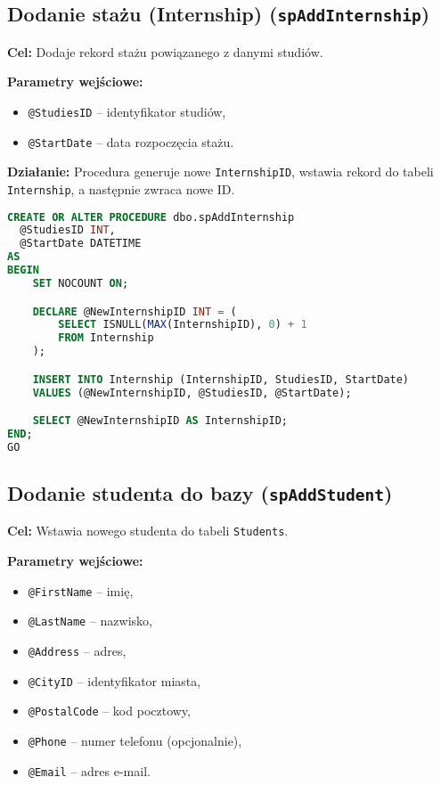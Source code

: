 \documentclass[12pt]{article}
\begin{document}
\newpage
\subsection{Dodanie stażu (Internship) (\texttt{spAddInternship})}
\textbf{Cel:} Dodaje rekord stażu powiązanego z danymi studiów.

\textbf{Parametry wejściowe:}
\begin{itemize}
  \item \verb|@StudiesID| – identyfikator studiów,
  \item \verb|@StartDate| – data rozpoczęcia stażu.
\end{itemize}

\textbf{Działanie:} Procedura generuje nowe \verb|InternshipID|, wstawia rekord do tabeli \verb|Internship|, a następnie zwraca nowe ID.

\begin{lstlisting}[language=SQL]
CREATE OR ALTER PROCEDURE dbo.spAddInternship
  @StudiesID INT,
  @StartDate DATETIME
AS
BEGIN
    SET NOCOUNT ON;

    DECLARE @NewInternshipID INT = (
        SELECT ISNULL(MAX(InternshipID), 0) + 1
        FROM Internship
    );

    INSERT INTO Internship (InternshipID, StudiesID, StartDate)
    VALUES (@NewInternshipID, @StudiesID, @StartDate);

    SELECT @NewInternshipID AS InternshipID;
END;
GO
\end{lstlisting}

\newpage
\subsection{Dodanie studenta do bazy (\texttt{spAddStudent})}
\textbf{Cel:} Wstawia nowego studenta do tabeli \verb|Students|.

\textbf{Parametry wejściowe:}
\begin{itemize}
  \item \verb|@FirstName| – imię,
  \item \verb|@LastName| – nazwisko,
  \item \verb|@Address| – adres,
  \item \verb|@CityID| – identyfikator miasta,
  \item \verb|@PostalCode| – kod pocztowy,
  \item \verb|@Phone| – numer telefonu (opcjonalnie),
  \item \verb|@Email| – adres e-mail.
\end{itemize}
\end{document}
